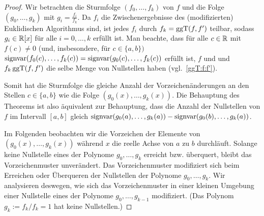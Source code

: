 \documentclass[11pt]{article}
\numberwithin{equation}{section}
\begin{document}
\begin{proof} 
	Wir betrachten die Sturmfolge $(f_0,\ldots,f_k)$ von $f$ und die Folge $(g_0,\ldots,g_k)$ mit $g_i = \frac{f_i}{f_k}$. Da $f_i$ die Zwischenergebnisse des (modifizierten) Euklidischen Algorithmus sind, ist jedes $f_i$ durch $f_k = \operatorname{ggT}(f,f')$ teilbar, sodass $g_i \in \mathbb{R}[x]$ für alle $i =0,\ldots,k$ erfüllt ist. Man beachte, dass für alle $c \in \mathbb{R}$ mit $f(c) \ne 0$ (und, insbesondere, für $c  \in \{a,b\})$ $\operatorname{signvar}(f_0(c),\ldots,f_k(c)) = \operatorname{signvar}(g_0(c),\ldots,f_k(c))$ erfüllt ist, $f$ und  und  $f_k\operatorname{ggT}(f,f')$ die selbe Menge von Nullstellen haben (vgl.~\ref{ggT:f:f'}). 
	
	Somit hat die Sturmfolge die gleiche Anzahl der Vorzeichenänderungen an den Stellen $c \in \{a,b\}$ wie die Folge $(g_0(x),\ldots,g_k(x))$. Die Behauptung des Theorems ist also äquivalent zur  Behauptung, dass die Anzahl der Nullstellen von $f$ im Intervall $[a,b]$ gleich $\operatorname{signvar}(g_0(a),\ldots,g_k(a)) - \operatorname{signvar}(g_0(b),\ldots,g_k(a))$. 
	
	Im Folgenden beobachten wir die Vorzeichen der Elemente von $(g_0(x),\ldots,g_k(x))$ während $x$ die reelle Achse von $a$ zu $b$ durchläuft. Solange keine Nullstelle eines der Polynome $g_0,\ldots,g_k$ erreicht bzw. überquert, bleibt das Vorzeichenmuster unverändert. Das Vorzeichenmuster modifiziert sich beim Erreichen oder Überqueren der Nullstellen der Polynome $g_0,\ldots,g_k$. Wir analysieren deswegen, wie sich das Vorzeichenmuster in einer kleinen Umgebung einer Nullstelle eines der Polynome $g_0,\ldots,g_{k-1}$ modifiziert. (Das Polynom $g_k := f_k / f_k =1$ hat keine Nullstellen.)
	

\end{proof}
\end{document}
